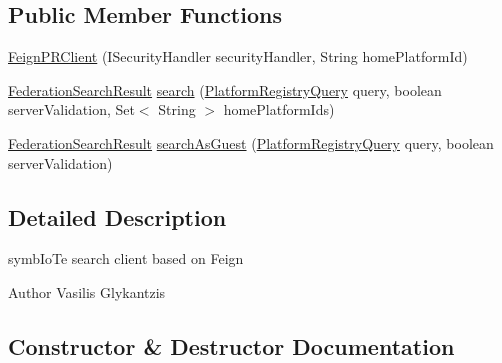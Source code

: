 \subsection*{Public Member Functions}
\begin{DoxyCompactItemize}
\item 
\hyperlink{classeu_1_1h2020_1_1symbiote_1_1client_1_1feign_1_1FeignPRClient_a03bd005af0545ca6d1ec9b334c0b91ab}{Feign\+P\+R\+Client} (I\+Security\+Handler security\+Handler, String home\+Platform\+Id)
\item 
\hyperlink{classeu_1_1h2020_1_1symbiote_1_1cloud_1_1model_1_1internal_1_1FederationSearchResult}{Federation\+Search\+Result} \hyperlink{classeu_1_1h2020_1_1symbiote_1_1client_1_1feign_1_1FeignPRClient_ab649b246e9d3a9f8d5908eb93615231f}{search} (\hyperlink{classeu_1_1h2020_1_1symbiote_1_1cloud_1_1model_1_1internal_1_1PlatformRegistryQuery}{Platform\+Registry\+Query} query, boolean server\+Validation, Set$<$ String $>$ home\+Platform\+Ids)
\item 
\hyperlink{classeu_1_1h2020_1_1symbiote_1_1cloud_1_1model_1_1internal_1_1FederationSearchResult}{Federation\+Search\+Result} \hyperlink{classeu_1_1h2020_1_1symbiote_1_1client_1_1feign_1_1FeignPRClient_af8496815060c4340e3aa3517d6fa2456}{search\+As\+Guest} (\hyperlink{classeu_1_1h2020_1_1symbiote_1_1cloud_1_1model_1_1internal_1_1PlatformRegistryQuery}{Platform\+Registry\+Query} query, boolean server\+Validation)
\end{DoxyCompactItemize}


\subsection{Detailed Description}
symb\+Io\+Te search client based on Feign

\begin{DoxyAuthor}{Author}
Vasilis Glykantzis 
\end{DoxyAuthor}


\subsection{Constructor \& Destructor Documentation}
\mbox{\label{classeu_1_1h2020_1_1symbiote_1_1client_1_1feign_1_1FeignPRClient_a03bd005af0545ca6d1ec9b334c0b91ab}} 
